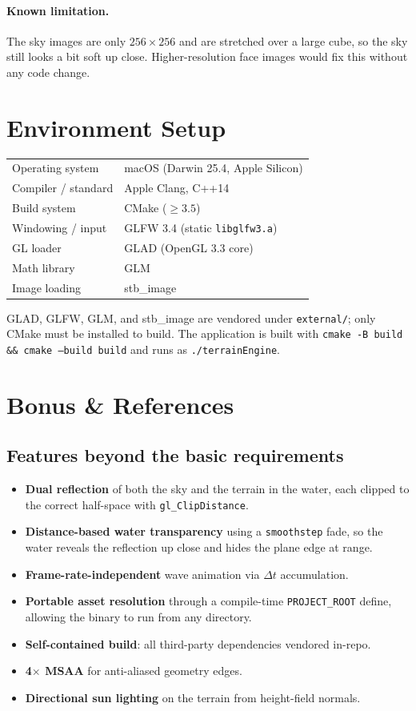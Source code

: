 \documentclass[11pt]{article}
\begin{document}
\paragraph{Known limitation.} The sky images are only $256\times256$ and are stretched over
a large cube, so the sky still looks a bit soft up close. Higher-resolution face images
would fix this without any code change.

\section{Environment Setup}

\begin{tabular}{ll}
\toprule
Operating system & macOS (Darwin 25.4, Apple Silicon) \\
Compiler / standard & Apple Clang, C++14 \\
Build system & CMake ($\geq 3.5$) \\
Windowing / input & GLFW 3.4 (static \texttt{libglfw3.a}) \\
GL loader & GLAD (OpenGL 3.3 core) \\
Math library & GLM \\
Image loading & stb\_image \\
\bottomrule
\end{tabular}

\medskip
\noindent GLAD, GLFW, GLM, and stb\_image are vendored under \texttt{external/}; only
CMake must be installed to build. The application is built with
\texttt{cmake -B build \&\& cmake --build build} and runs as \texttt{./terrainEngine}.

\section{Bonus \& References}

\subsection*{Features beyond the basic requirements}
\begin{itemize}[leftmargin=1.5em]
  \item \textbf{Dual reflection} of both the sky and the terrain in the water, each
        clipped to the correct half-space with \texttt{gl\_ClipDistance}.
  \item \textbf{Distance-based water transparency} using a \texttt{smoothstep} fade, so
        the water reveals the reflection up close and hides the plane edge at range.
  \item \textbf{Frame-rate-independent} wave animation via $\Delta t$ accumulation.
  \item \textbf{Portable asset resolution} through a compile-time \texttt{PROJECT\_ROOT}
        define, allowing the binary to run from any directory.
  \item \textbf{Self-contained build}: all third-party dependencies vendored in-repo.
  \item \textbf{4$\times$ MSAA} for anti-aliased geometry edges.
  \item \textbf{Directional sun lighting} on the terrain from height-field normals.
\end{itemize}
\end{document}
